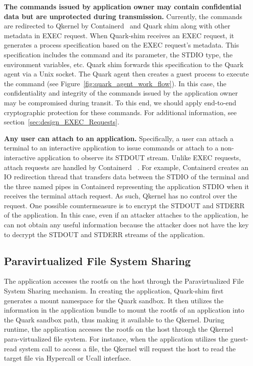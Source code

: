 \textbf{The commands issued by application owner may contain confidential data but are unprotected during transmission.} Currently, the commands are redirected to Qkernel by Containerd~\cite*{containerd} and Quark shim along with other metadata in EXEC request. When Quark-shim receives an EXEC request, it generates 
a process specification based on the EXEC request’s metadata. This specification includes the command and its parameter, the STDIO type, the environment variables, etc. Quark shim forwards this specification to the Quark agent via a Unix socket. The Quark agent then creates a guest process to 
execute the command (see Figure~\ref{fig:quark_agent_work_flow}). In this case, the confidentiality and integrity of the commands issued by the application owner may be compromised during transit. To this end, we should apply end-to-end cryptographic protection for these 
commands. For additional information, see section~\ref{sec:design_EXEC_Requests}.



\textbf{Any user can attach to an application.} Specifically, a user can attach a terminal to an interactive application to issue commands or attach to a non-interactive application to observe its STDOUT stream. Unlike EXEC requests, attach requests are handled by Containerd~\cite*{containerd} . For example, Containerd  creates an IO redirection thread that transfers data 
between the STDIO of the terminal and the three named pipes in Containerd representing the application STDIO when it receives the terminal attach request. As such, Qkernel has no control over the request. One possible countermeasure is to encrypt the STDOUT and STDERR of the application. In this case, even if an attacker attaches to the application, he 
can not obtain any useful information because the attacker does not have the key to decrypt the STDOUT and STDERR streams of the application.



\subsection{Paravirtualized File System Sharing}
The application accesses the rootfs on the host through the Paravirtualized File System Sharing mechanism. In creating the application, Quark-shim first generates a mount namespace for the Quark sandbox. It then utilizes the information in the application bundle to mount the rootfs of an application 
into the Quark sandbox path, thus making it available to the Qkernel. During runtime, the application accesses the rootfs on the host through the Qkernel para-virtualized file system. For instance, when the application utilizes the guest-read system call to access a file, the Qkernel will request 
the host to read the target file via Hypercall or Ucall interface. 


